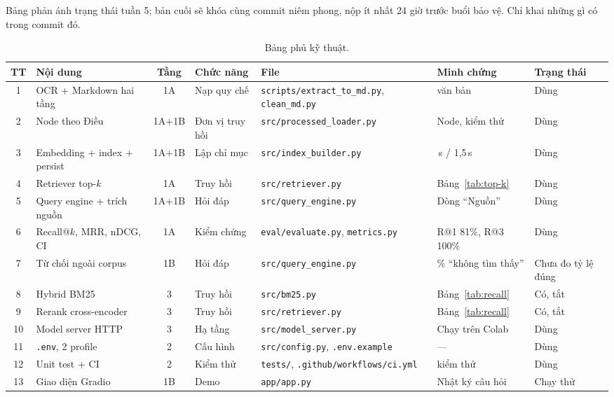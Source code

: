 Bảng phản ánh trạng thái tuần 5; bản cuối sẽ khóa cùng commit niêm phong, nộp ít nhất 24 giờ trước buổi bảo vệ. Chỉ khai
những gì có trong commit đó.

\begin{table}[H]
  \centering
  \scriptsize
  \begin{tabularx}{\textwidth}{c >{\hsize=1.1\hsize}X c >{\hsize=0.7\hsize}X >{\hsize=1.2\hsize}X >{\hsize=1\hsize}X l}
    \toprule
    \textbf{TT} & \textbf{Nội dung} & \textbf{Tầng} & \textbf{Chức năng} & \textbf{File} & \textbf{Minh chứng} & \textbf{Trạng thái} \\
    \midrule
    1 & OCR + Markdown hai tầng & 1A & Nạp quy chế & \texttt{scripts/extract\_to\_md.py}, \texttt{clean\_md.py} & 6 văn bản & Dùng \\
    2 & Node theo Điều & 1A+1B & Đơn vị truy hồi & \texttt{src/processed\_loader.py} & 54 Node, kiểm thử & Dùng \\
    3 & Embedding + index + persist & 1A+1B & Lập chỉ mục & \texttt{src/index\_builder.py} & 77\,s / 1,5\,s & Dùng \\
    4 & Retriever top-$k$ & 1A & Truy hồi & \texttt{src/retriever.py} & Bảng~\ref{tab:top-k} & Dùng \\
    5 & Query engine + trích nguồn & 1A+1B & Hỏi đáp & \texttt{src/query\_engine.py} & Dòng ``Nguồn'' & Dùng \\
    6 & Recall@$k$, MRR, nDCG, CI & 1A & Kiểm chứng & \texttt{eval/evaluate.py}, \texttt{metrics.py} & R@1 81\%, R@3 100\% & Dùng \\
    7 & Từ chối ngoài corpus & 1B & Hỏi đáp & \texttt{src/query\_engine.py} & 41\% ``không tìm thấy'' & Chưa đo tỷ lệ đúng \\
    8 & Hybrid BM25 & 3 & Truy hồi & \texttt{src/bm25.py} & Bảng~\ref{tab:recall} & Có, tắt \\
    9 & Rerank cross-encoder & 3 & Truy hồi & \texttt{src/retriever.py} & Bảng~\ref{tab:recall} & Có, tắt \\
    10 & Model server HTTP & 3 & Hạ tầng & \texttt{src/model\_server.py} & Chạy trên Colab & Dùng \\
    11 & \texttt{.env}, 2 profile & 2 & Cấu hình & \texttt{src/config.py}, \texttt{.env.example} & --- & Dùng \\
    12 & Unit test + CI & 2 & Kiểm thử & \texttt{tests/}, \texttt{.github/workflows/ci.yml} & 26 kiểm thử & Dùng \\
    13 & Giao diện Gradio & 1B & Demo & \texttt{app/app.py} & Nhật ký câu hỏi & Chạy thử \\
    \bottomrule
  \end{tabularx}
  \caption{Bảng phủ kỹ thuật.}
  \label{tab:bang-phu}
\end{table}
